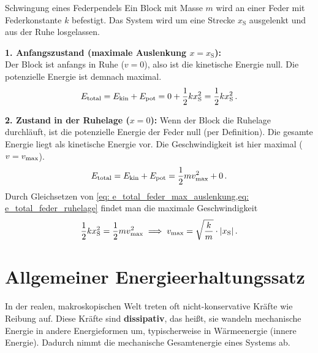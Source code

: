 \begin{examplebox}[breakable]{Schwingung eines Federpendels}
    Ein Block mit Masse $m$ wird an einer Feder mit Federkonstante $k$ befestigt. Das System wird um eine Strecke $x_\text{S}$ ausgelenkt und aus der Ruhe losgelassen. 

    \textbf{1. Anfangszustand (maximale Auslenkung $x=x_\text{S}$):}\\
    
    Der Block ist anfangs in Ruhe ($v=0$), also ist die kinetische Energie null. Die potenzielle Energie ist demnach maximal.
    \begin{equation}\label{eq: e_total_feder_max_auslenkung}
        E_{\text{total}} = E_{\text{kin}} + E_{\text{pot}} = 0 + \frac{1}{2}kx_\text{S}^2 = \frac{1}{2}kx_\text{S}^2 \,.
    \end{equation}

    \textbf{2. Zustand in der Ruhelage ($x=0$):}
    Wenn der Block die Ruhelage durchläuft, ist die potenzielle Energie der Feder null (per Definition). Die gesamte Energie liegt als kinetische Energie vor. Die Geschwindigkeit ist hier maximal ($v=v_{\mathrm{max}}$).
    \begin{equation}\label{eq: e_total_feder_ruhelage}
        E_{\text{total}} = E_{\text{kin}} + E_{\text{pot}} = \frac{1}{2}mv_{\mathrm{max}}^2 + 0 \,.
    \end{equation}
    Durch Gleichsetzen von \cref{eq: e_total_feder_max_auslenkung,eq: e_total_feder_ruhelage} findet man die maximale Geschwindigkeit
    \begin{equation}
        \frac{1}{2}kx_\text{S}^2 = \frac{1}{2}mv_{\mathrm{max}}^2 \implies v_{\mathrm{max}} = \sqrt{\frac{k}{m}} \cdot |x_\text{S}| \,.
    \end{equation}
\end{examplebox}




\section{Allgemeiner Energieerhaltungssatz}\label{sec: allgemeiner_energieerhaltungssatz}
In der realen, makroskopischen Welt treten oft nicht-konservative Kräfte wie Reibung auf. Diese Kräfte sind \textbf{dissipativ}, das heißt, sie wandeln mechanische Energie in andere Energieformen um, typischerweise in Wärmeenergie (innere Energie). Dadurch nimmt die mechanische Gesamtenergie eines Systems ab.

